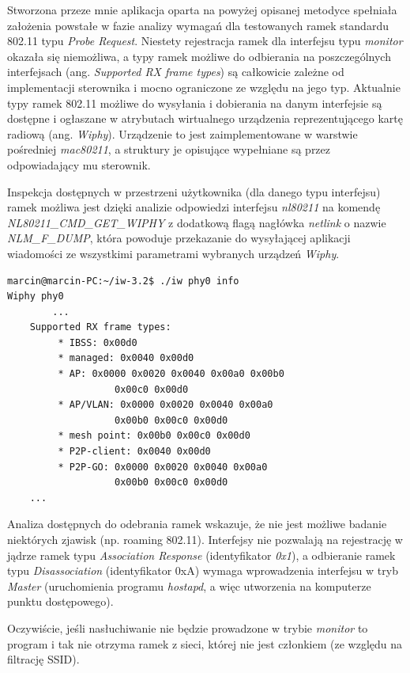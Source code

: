Stworzona przeze mnie aplikacja oparta na powyżej opisanej metodyce spełniała założenia powstałe w fazie analizy wymagań dla testowanych ramek standardu 802.11 typu \emph{Probe Request}. Niestety rejestracja ramek dla interfejsu typu \emph{monitor} okazała się niemożliwa, a typy ramek możliwe do odbierania na poszczególnych interfejsach (ang. \emph{Supported RX frame types}) są całkowicie zależne od implementacji sterownika i mocno ograniczone ze względu na jego typ. Aktualnie typy ramek 802.11 możliwe do wysyłania i dobierania na danym interfejsie są dostępne i ogłaszane w atrybutach wirtualnego urządzenia reprezentującego kartę radiową (ang. \emph{Wiphy}). Urządzenie to jest zaimplementowane w warstwie pośredniej \emph{mac80211}, a struktury je opisujące wypełniane są przez odpowiadający mu sterownik.

Inspekcja dostępnych w przestrzeni użytkownika (dla danego typu interfejsu) ramek możliwa jest dzięki analizie odpowiedzi interfejsu \emph{nl80211} na komendę \emph{NL80211\_CMD\_GET\_WIPHY} z dodatkową flagą nagłówka \emph{netlink} o nazwie \emph{NLM\_F\_DUMP}, która powoduje przekazanie do wysyłającej aplikacji wiadomości ze wszystkimi parametrami wybranych urządzeń \emph{Wiphy}.

\begin{lstlisting}[frame=tb]
marcin@marcin-PC:~/iw-3.2$ ./iw phy0 info
Wiphy phy0
        ...
	Supported RX frame types:
		 * IBSS: 0x00d0
		 * managed: 0x0040 0x00d0
		 * AP: 0x0000 0x0020 0x0040 0x00a0 0x00b0 
                   0x00c0 0x00d0
		 * AP/VLAN: 0x0000 0x0020 0x0040 0x00a0 
                   0x00b0 0x00c0 0x00d0
		 * mesh point: 0x00b0 0x00c0 0x00d0
		 * P2P-client: 0x0040 0x00d0
		 * P2P-GO: 0x0000 0x0020 0x0040 0x00a0 
                   0x00b0 0x00c0 0x00d0
	...
\end{lstlisting}

Analiza dostępnych do odebrania ramek wskazuje, że nie jest możliwe badanie niektórych zjawisk (np. roaming 802.11). Interfejsy nie pozwalają na rejestrację w jądrze ramek typu \emph{Association Response} (identyfikator \emph{0x1}), a odbieranie ramek typu \emph{Disassociation} (identyfikator 0xA) wymaga wprowadzenia interfejsu w tryb \emph{Master} (uruchomienia programu \emph{hostapd}, a więc utworzenia na komputerze punktu dostępowego). 

Oczywiście, jeśli nasłuchiwanie nie będzie prowadzone w trybie \emph{monitor} to program i tak nie otrzyma ramek z sieci, której nie jest członkiem (ze względu na filtrację SSID). 

